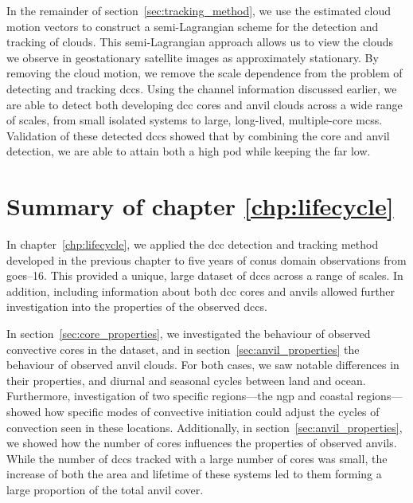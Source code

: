 In the remainder of section~\ref{sec:tracking_method}, we use the estimated cloud motion vectors to construct a semi-Lagrangian scheme for the detection and tracking of clouds.
This semi-Lagrangian approach allows us to view the clouds we observe in geostationary satellite images as approximately stationary.
By removing the cloud motion, we remove the scale dependence from the problem of detecting and tracking \acrshort{dcc}s.
Using the channel information discussed earlier, we are able to detect both developing \acrshort{dcc} cores and anvil clouds across a wide range of scales, from small isolated systems to large, long-lived, multiple-core \acrshort{mcs}s.
Validation of these detected \acrshort{dcc}s showed that by combining the core and anvil detection, we are able to attain both a high \acrshort{pod} while keeping the \acrshort{far} low.

\section{Summary of chapter \ref{chp:lifecycle}}

In chapter~\ref{chp:lifecycle}, we applied the \acrshort{dcc} detection and tracking method developed in the previous chapter to five years of \acrshort{conus} domain observations from \acrshort{goes}--16.
This provided a unique, large dataset of \acrshort{dcc}s across a range of scales.
In addition, including information about both \acrshort{dcc} cores and anvils allowed further investigation into the properties of the observed \acrshort{dcc}s.

In section~\ref{sec:core_properties}, we investigated the behaviour of observed convective cores in the dataset, and in section~\ref{sec:anvil_properties} the behaviour of observed anvil clouds.
For both cases, we saw notable differences in their properties, and diurnal and seasonal cycles between land and ocean.
Furthermore, investigation of two specific regions---the \acrshort{ngp} and coastal regions---showed how specific modes of convective initiation could adjust the cycles of convection seen in these locations.
Additionally, in section~\ref{sec:anvil_properties}, we showed how the number of cores influences the properties of observed anvils.
While the number of \acrshort{dcc}s tracked with a large number of cores was small, the increase of both the area and lifetime of these systems led to them forming a large proportion of the total anvil cover.

